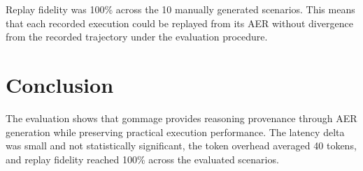 \documentclass[11pt,a4paper]{article}
\begin{document}
Replay fidelity was 100\% across the 10 manually generated scenarios. This means
that each recorded execution could be replayed from its AER without divergence
from the recorded trajectory under the evaluation procedure.

\section{Conclusion}

The evaluation shows that gommage provides reasoning provenance through AER
generation while preserving practical execution performance. The latency delta
was small and not statistically significant, the token overhead averaged 40
tokens, and replay fidelity reached 100\% across the evaluated scenarios.
\end{document}
